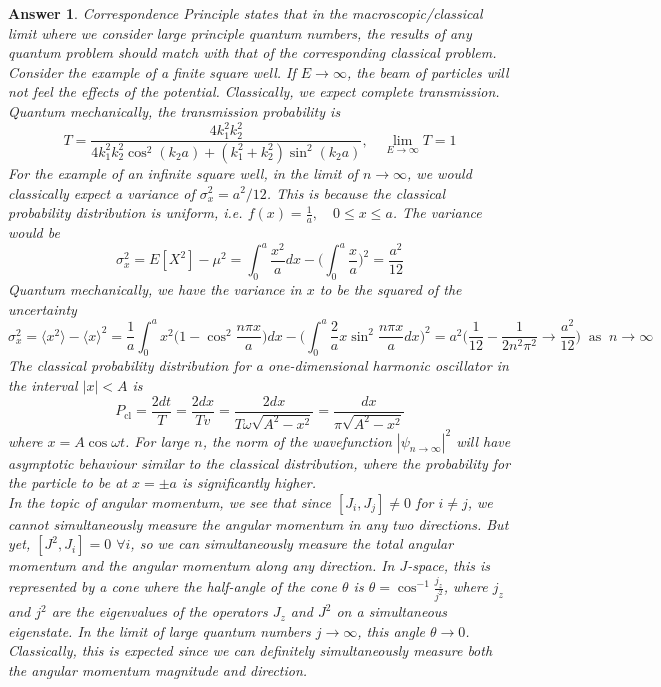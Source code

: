 \documentclass[a4paper]{article}
\newtheorem{ans}{Answer}[section]
\theoremstyle{new}
\begin{document}
\begin{ans}
Correspondence Principle states that in the macroscopic/classical limit where we consider large principle quantum numbers, the results of any quantum problem should match with that of the corresponding classical problem.\\[5pt]
Consider the example of a finite square well. If $E\rightarrow\infty$, the beam of particles will not feel the effects of the potential. Classically, we expect complete transmission. Quantum mechanically, the transmission probability is
$$T=\frac{4k_1^2k_2^2}{4k_1^2k_2^2\cos^2(k_2a)+(k_1^2+k_2^2)\sin^2(k_2a)},\quad\lim_{E\rightarrow\infty}T=1$$
For the example of an infinite square well, in the limit of $n\rightarrow\infty$, we would classically expect a variance of $\sigma_x^2=a^2/12$. This is because the classical probability distribution is uniform, i.e. $f(x)=\frac{1}{a},\quad 0\leq x\leq a$. The variance would be
$$\sigma_x^2=E[X^2]-\mu^2=\int_0^a\frac{x^2}{a}dx-\bigg(\int_0^a\frac{x}{a}\bigg)^2=\frac{a^2}{12}$$
Quantum mechanically, we have the variance in $x$ to be the squared of the uncertainty
$$\sigma_x^2=\langle x^2\rangle-\langle x\rangle^2=\frac{1}{a}\int_0^ax^2\bigg(1-\cos^2\frac{n\pi x}{a}\bigg)dx-\bigg(\int_0^a\frac{2}{a}x\sin^2\frac{n\pi x}{a}dx\bigg)^2=a^2\bigg(\frac{1}{12}-\frac{1}{2n^2\pi^2}\rightarrow\frac{a^2}{12}\bigg)~\text{ as }~n\rightarrow\infty$$
The classical probability distribution for a one-dimensional harmonic oscillator in the interval $|x|<A$ is
$$P_{\text{cl}}=\frac{2dt}{T}=\frac{2dx}{Tv}=\frac{2dx}{T\omega\sqrt{A^2-x^2}}=\frac{dx}{\pi\sqrt{A^2-x^2}}$$
where $x=A\cos\omega t$. For large $n$, the norm of the wavefunction $|\psi_{n\rightarrow\infty}|^2$ will have asymptotic behaviour similar to the classical distribution, where the probability for the particle to be at $x=\pm a$ is significantly higher.\\[5pt]
In the topic of angular momentum, we see that since $[J_i,J_j]\neq 0$ for $i\neq j$, we cannot simultaneously measure the angular momentum in any two directions. But yet, $[J^2,J_i]=0$ $\forall i$, so we can simultaneously measure the total angular momentum and the angular momentum along any direction. In $J$-space, this is represented by a cone where the half-angle of the cone $\theta$ is $\theta=\cos^{-1}\frac{j_z}{j^2}$, where $j_z$ and $j^2$ are the eigenvalues of the operators $J_z$ and $J^2$ on a simultaneous eigenstate. In the limit of large quantum numbers $j\rightarrow\infty$, this angle $\theta\rightarrow 0$. Classically, this is expected since we can definitely simultaneously measure both the angular momentum magnitude and direction.\\[5pt]

\end{ans}
\end{document}
